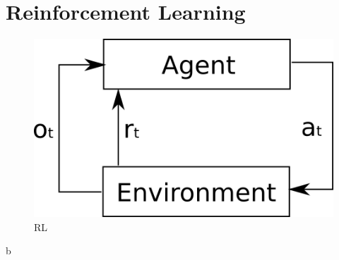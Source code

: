 \section{Reinforcement Learning}

\begin{figure}[H]
  \centering
  \includegraphics[width=430px]{Images/rl_agent.png} 
  \caption{RL}
  \label{fig:reinforcement_learning}
\end{figure}

b




